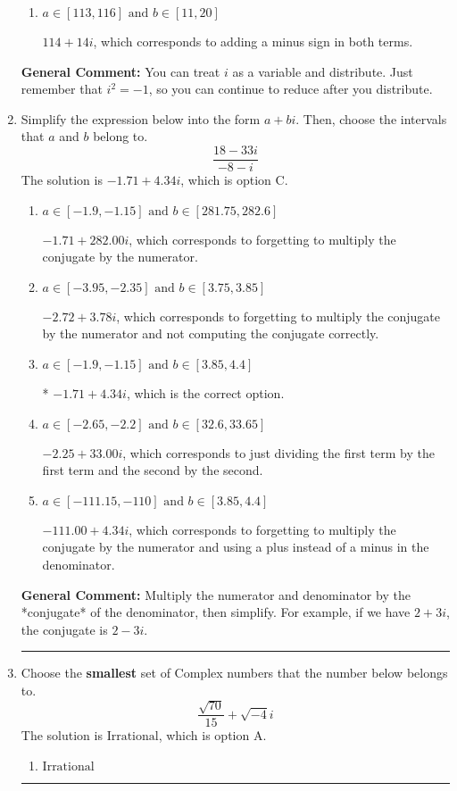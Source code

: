 \documentclass{extbook}[14pt]
\newcommand{\litem}[1]{\item #1

\rule{\textwidth}{0.4pt}}
\begin{document}
\begin{enumerate}
{\begin{enumerate}[label=\Alph*.]
 $-66 - 94 i$, which corresponds to adding a minus sign in the second term.
\item \( a \in [113, 116] \text{ and } b \in [11, 20] \)

 $114 + 14 i$, which corresponds to adding a minus sign in both terms.
\end{enumerate}

\textbf{General Comment:} You can treat $i$ as a variable and distribute. Just remember that $i^2=-1$, so you can continue to reduce after you distribute.
}
\litem{
Simplify the expression below into the form $a+bi$. Then, choose the intervals that $a$ and $b$ belong to.
\[ \frac{18 - 33 i}{-8 - i} \]The solution is \( -1.71  + 4.34 i \), which is option C.\begin{enumerate}[label=\Alph*.]
\item \( a \in [-1.9, -1.15] \text{ and } b \in [281.75, 282.6] \)

 $-1.71  + 282.00 i$, which corresponds to forgetting to multiply the conjugate by the numerator.
\item \( a \in [-3.95, -2.35] \text{ and } b \in [3.75, 3.85] \)

 $-2.72  + 3.78 i$, which corresponds to forgetting to multiply the conjugate by the numerator and not computing the conjugate correctly.
\item \( a \in [-1.9, -1.15] \text{ and } b \in [3.85, 4.4] \)

* $-1.71  + 4.34 i$, which is the correct option.
\item \( a \in [-2.65, -2.2] \text{ and } b \in [32.6, 33.65] \)

 $-2.25  + 33.00 i$, which corresponds to just dividing the first term by the first term and the second by the second.
\item \( a \in [-111.15, -110] \text{ and } b \in [3.85, 4.4] \)

 $-111.00  + 4.34 i$, which corresponds to forgetting to multiply the conjugate by the numerator and using a plus instead of a minus in the denominator.
\end{enumerate}

\textbf{General Comment:} Multiply the numerator and denominator by the *conjugate* of the denominator, then simplify. For example, if we have $2+3i$, the conjugate is $2-3i$.
}
\litem{
Choose the \textbf{smallest} set of Complex numbers that the number below belongs to.
\[ \frac{\sqrt{70}}{15}+\sqrt{-4}i \]The solution is \( \text{Irrational} \), which is option A.\begin{enumerate}[label=\Alph*.]
\item \( \text{Irrational} \)


\end{enumerate}}
\end{enumerate}
\end{document}
